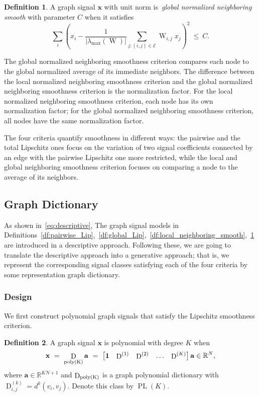 \documentclass[journal,twocolumn,10pt]{IEEEtran}
\theoremstyle{definition}
\newtheorem{defn}{Definition}
\newcommand{\R}{\ensuremath{\mathbb{R}}}
\def\a{\mathbf{a}}
\def\x{\mathbf{x}}
\def\E{\mathcal{E}}
\DeclareMathOperator{\PL}{PL}
\DeclareMathOperator{\D}{D}
\DeclareMathOperator{\W}{W}
\begin{document}
\begin{defn}
\label{df:global_neighboring_smooth}
A graph signal $\x$ with unit norm  is~\emph{global normalized neighboring smooth} with parameter $C$ when it satisfies
\begin{equation*}
	  \sum_i \left(  x_i -  \frac{1}{ |\lambda_{\max}(\W)| }  \sum_{j: (i,j) \in \E} \W_{i,j} x_j  \right)^2  \ \leq \  C.
\end{equation*}
\end{defn}
\noindent The global normalized neighboring smoothness criterion compares each node to the global normalized  average of its immediate neighbors. The difference between the local normalized neighboring smoothness criterion and the global normalized neighboring smoothness criterion is the normalization factor. For the local normalized neighboring smoothness criterion, each node has its own normalization factor;
for the global normalized neighboring smoothness criterion, all nodes have the same normalization factor.


The four criteria quantify smoothness in different ways: the pairwise
and the total Lipschitz ones focus on the variation of two signal
coefficients connected by an edge with the pairwise Lipschitz one more
restricted, while the local and global neighboring smoothness criterion focuses on
comparing a node to the average of its neighbors. 



\subsection{Graph Dictionary}
As shown in~\eqref{eq:descriptive}, The graph signal models in Definitions~\ref{df:pairwise_Lip},~\ref{df:global_Lip},~\ref{df:local_neighboring_smooth},~\ref{df:global_neighboring_smooth} are introduced in a descriptive approach. Following these, we are going to translate the descriptive approach into a generative approach; that is,  we  represent
the corresponding signal classes satisfying each of the four criteria by some representation graph dictionary.


\subsubsection{Design}
 We first construct polynomial graph signals that satisfy the Lipschitz smoothness criterion.

\begin{defn}
\label{df:polynomial_sig}
A graph signal $\x$ is polynomial with degree $K$ when
\begin{equation*}
	\x \ = \  \D_{\rm poly(K)}  \a \ = \ \begin{bmatrix}
	{\bf 1}  &  \D^{(1)}  & \D^{(2)}  &  \ldots &  \D^{(K)} 
	\end{bmatrix} 
	\a \in \R^N,
\end{equation*}
where $\a \in \R^{KN+1}$ and $\D_{\rm poly(K)} $ is a graph polynomial dictionary with $\D^{(k)}_{i,j} = d^k(v_i, v_j)$. Denote this class by $\PL(K)$. 
\end{defn}
\end{document}
